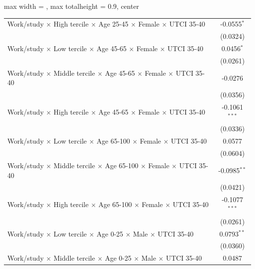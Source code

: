 \begin{table}[htbp]
\begin{adjustbox}{max width = \textwidth, max totalheight = 0.9\textheight, center}
\begin{tabular}{lc}
         Work/study $\times$ High tercile $\times$ Age 25-45 $\times$ Female $\times$ UTCI 35-40        & -0.0555$^{*}$\\   
                                                                                                        & (0.0324)\\   
         Work/study $\times$ Low tercile $\times$ Age 45-65 $\times$ Female $\times$ UTCI 35-40         & 0.0456$^{*}$\\   
                                                                                                        & (0.0261)\\   
         Work/study $\times$ Middle tercile $\times$ Age 45-65 $\times$ Female $\times$ UTCI 35-40      & -0.0276\\   
                                                                                                        & (0.0356)\\   
         Work/study $\times$ High tercile $\times$ Age 45-65 $\times$ Female $\times$ UTCI 35-40        & -0.1061$^{***}$\\   
                                                                                                        & (0.0336)\\   
         Work/study $\times$ Low tercile $\times$ Age 65-100 $\times$ Female $\times$ UTCI 35-40        & 0.0577\\   
                                                                                                        & (0.0604)\\   
         Work/study $\times$ Middle tercile $\times$ Age 65-100 $\times$ Female $\times$ UTCI 35-40     & -0.0985$^{**}$\\   
                                                                                                        & (0.0421)\\   
         Work/study $\times$ High tercile $\times$ Age 65-100 $\times$ Female $\times$ UTCI 35-40       & -0.1077$^{***}$\\   
                                                                                                        & (0.0261)\\   
         Work/study $\times$ Low tercile $\times$ Age 0-25 $\times$ Male $\times$ UTCI 35-40            & 0.0793$^{**}$\\   
                                                                                                        & (0.0360)\\   
         Work/study $\times$ Middle tercile $\times$ Age 0-25 $\times$ Male $\times$ UTCI 35-40         & 0.0487\\   

\end{tabular}
\end{adjustbox}
\end{table}
